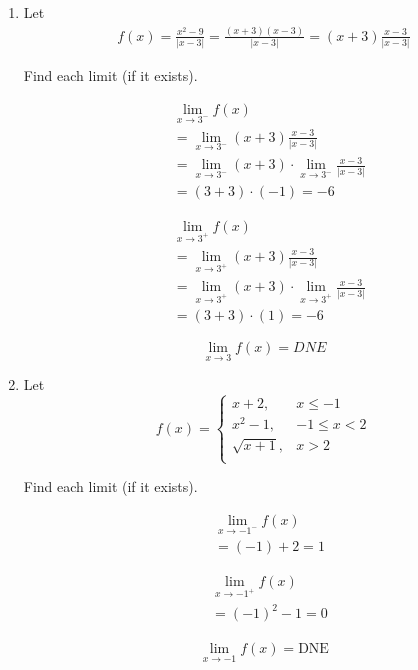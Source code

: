 \documentclass{exam}
\begin{document}
\begin{enumerate}
\item
Let 
\begin{align*}
f(x)=\frac{x^{2}-9}{|x-3|}=\frac{(x+3)(x-3)}{|x-3|}=(x+3)\frac{x-3}{|x-3|}
\end{align*}

Find each limit (if it exists).

\begin{minipage}{.3\linewidth}
\begin{align*}
 &\lim_{x\to 3^{-}}f(x)\\
 &=\lim_{x\to 3^{-}}(x+3)\frac{x-3}{|x-3|}\\
 &=\lim_{x\to 3^{-}}(x+3)\cdot\lim_{x\to 3^{-}}\frac{x-3}{|x-3|}\\
 &=(3+3)\cdot (-1) = -6
\end{align*}
\end{minipage}%
\begin{minipage}{.5\linewidth}
\begin{align*}
 &\lim_{x\to 3^{+}}f(x)\\
 &=\lim_{x\to 3^{+}}(x+3)\frac{x-3}{|x-3|}\\
 &=\lim_{x\to 3^{+}}(x+3)\cdot\lim_{x\to 3^{+}}\frac{x-3}{|x-3|}\\
 &=(3+3)\cdot (1) = -6
\end{align*}
\end{minipage}%
\begin{minipage}{.2\linewidth}
\begin{equation*}
 \lim_{x\to 3}f(x) = DNE
\end{equation*}
\end{minipage}

\vfill


\newpage

\item
Let 
\[   f(x)=\left\{
\begin{array}{ll}
      x+2, & x\leq -1 \\
      x^{2}-1,& -1\leq x < 2\\
      \sqrt{x+1},   & x>2 \\
\end{array} 
\right. \]

Find each limit (if it exists).

\begin{minipage}{.3\linewidth}
\begin{align*}
 &\lim_{x\to -1^{-}}f(x)\\
 &=(-1)+2=1
\end{align*}
\end{minipage}%
\begin{minipage}{.3\linewidth}
\begin{align*}
 &\lim_{x\to -1^{+}}f(x)\\
 &=(-1)^{2}-1=0
\end{align*}
\end{minipage}%
\begin{minipage}{.3\linewidth}
\begin{align*}
 \lim_{x\to -1}f(x)=\text{DNE}
\end{align*}
\end{minipage}


\end{enumerate}
\end{document}

